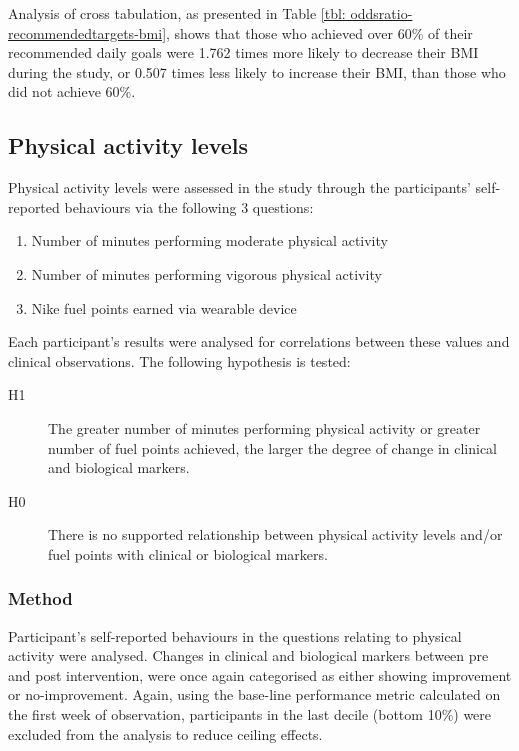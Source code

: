 Analysis of cross tabulation, as presented in Table \ref{tbl: oddsratio-recommendedtargets-bmi}, shows that those who achieved over 60\% of their recommended daily goals were 1.762 times more likely to decrease their BMI during the study, or 0.507 times less likely to increase their BMI, than those who did not achieve 60\%.

\subsection{Physical activity levels}
Physical activity levels were assessed in the study through the participants' self-reported behaviours via the following 3 questions:
\begin{enumerate}[noitemsep,topsep=0pt]
	\item Number of minutes performing moderate physical activity
	\item Number of minutes performing vigorous physical activity
	\item Nike fuel points earned via wearable device
\end{enumerate}

Each participant’s results were analysed for correlations between these values and clinical observations. The following hypothesis is tested:
\begin{description}
  \item[H1] The greater number of minutes performing physical activity or greater number of fuel points achieved, the larger the degree of change in clinical and biological markers.
  \item[H0] There is no supported relationship between physical activity levels and/or fuel points with clinical or biological markers.
  \end{description}

\subsubsection{Method}
Participant's self-reported behaviours in the questions relating to physical activity were analysed. Changes in clinical and biological markers between pre and post intervention, were once again categorised as either showing improvement or no-improvement.
Again, using the base-line performance metric calculated on the first week of observation, participants in the last decile (bottom 10\%) were excluded from the analysis to reduce ceiling effects. 


